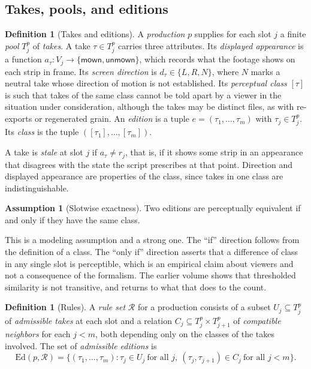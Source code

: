 \documentclass[11pt,twoside,openright]{book}
\theoremstyle{plain}
\theoremstyle{definition}
\newtheorem{definition}[theorem]{Definition}
\newtheorem{assumption}[theorem]{Assumption}
\theoremstyle{remark}
\newcommand{\Ed}{\mathrm{Ed}}       %
\newcommand{\mown}{\mathsf{mown}}
\newcommand{\unmown}{\mathsf{unmown}}
\begin{document}
\subsection{Takes, pools, and editions}

\begin{definition}[Takes and editions]\label{def:edition}
A \emph{production} $p$ supplies for each slot $j$ a finite \emph{pool} $T^p_j$ of \emph{takes}. A take $\tau\in T^p_j$ carries three attributes. Its \emph{displayed appearance} is a function $a_\tau:V_j\to\{\mown,\unmown\}$, which records what the footage shows on each strip in frame. Its \emph{screen direction} is $d_\tau\in\{L,R,N\}$, where $N$ marks a neutral take whose direction of motion is not established. Its \emph{perceptual class} $[\tau]$ is such that takes of the same class cannot be told apart by a viewer in the situation under consideration, although the takes may be distinct files, as with re-exports or regenerated grain. An \emph{edition} is a tuple $e=(\tau_1,\dots,\tau_m)$ with $\tau_j\in T^p_j$. Its \emph{class} is the tuple $([\tau_1],\dots,[\tau_m])$.
\end{definition}

A take is \emph{stale} at slot $j$ if $a_\tau\ne r_j$, that is, if it shows some strip in an appearance that disagrees with the state the script prescribes at that point. Direction and displayed appearance are properties of the class, since takes in one class are indistinguishable.

\begin{assumption}[Slotwise exactness]\label{ass:slotwise}
Two editions are perceptually equivalent if and only if they have the same class.
\end{assumption}

This is a modeling assumption and a strong one. The ``if'' direction follows from the definition of a class. The ``only if'' direction asserts that a difference of class in any single slot is perceptible, which is an empirical claim about viewers and not a consequence of the formalism. The earlier volume shows that thresholded similarity is not transitive, and  returns to what that does to the count.

\begin{definition}[Rules]\label{def:rules}
A \emph{rule set} $\mathcal R$ for a production consists of a subset $U_j\subseteq T^p_j$ of \emph{admissible takes} at each slot and a relation $C_j\subseteq T^p_j\times T^p_{j+1}$ of \emph{compatible neighbors} for each $j<m$, both depending only on the classes of the takes involved. The set of \emph{admissible editions} is
\[
\Ed(p,\mathcal R)=\bigl\{(\tau_1,\dots,\tau_m):\tau_j\in U_j\ \text{for all }j,\ (\tau_j,\tau_{j+1})\in C_j\ \text{for all }j<m\bigr\}.
\]
\end{definition}
\end{document}
